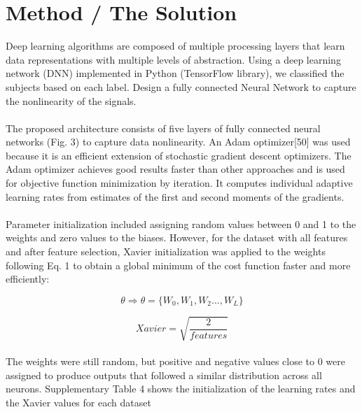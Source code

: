 \documentclass{llncs}       %
\begin{document}
\paragraph{}

\section{Method / The Solution}
\label{sec:3}
Deep learning algorithms are composed of multiple processing layers that learn data representations with multiple levels of abstraction. Using a deep learning network (DNN) implemented in Python (TensorFlow library), we classified the subjects based on each label.  Design a fully connected Neural Network to capture the nonlinearity of the signals.
 
\paragraph{}
The proposed architecture consists of five layers of fully connected neural networks (Fig. 3) to capture data nonlinearity. An Adam optimizer[50] was used because it is an efficient extension of stochastic gradient descent optimizers. The Adam optimizer achieves good results faster than other approaches and is used for objective function minimization by iteration. It computes individual adaptive learning rates from estimates of the first and second moments of the gradients.

\paragraph{}
Parameter initialization included assigning random values between 0 and 1 to the weights and zero values to the biases. However, for the dataset with all features and after feature selection, Xavier initialization was applied to the weights following Eq. 1 to obtain a global minimum of the cost function faster and more efficiently: 

\begin{equation} 
\theta\Rightarrow\theta=\{W_{0},W_{1},W_{2}...,W_{L}\}
\end{equation}

\begin{equation} 
Xavier = \sqrt{\frac{2}{features}}
\end{equation}

\paragraph{}
The weights were still random, but positive and negative values close to 0 were assigned to produce outputs that followed a similar distribution across all neurons. Supplementary Table 4 shows the initialization of the learning rates and the Xavier values for each dataset
\end{document}
